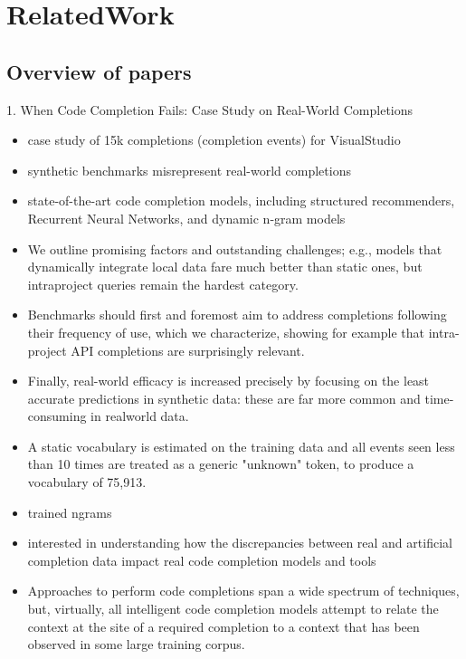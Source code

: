 \chapter{RelatedWork}
\label{chap:RelatedWork}

\section{Overview of papers}
1. When Code Completion Fails: Case Study on
Real-World Completions
\begin{itemize}
	\item case study of 15k completions (completion events) for VisualStudio
	\item synthetic benchmarks misrepresent real-world completions
	\item state-of-the-art code completion models, including structured recommenders, Recurrent Neural Networks, and dynamic n-gram models
    \item We outline promising factors and outstanding challenges; e.g., models that dynamically integrate local data fare much better than static ones, but intraproject queries remain the hardest category.
    \item Benchmarks should first and foremost aim to address completions following their frequency of use, which we characterize, showing for example that intra-project API completions are surprisingly relevant.
    \item Finally, real-world efficacy is increased precisely by focusing on the least accurate predictions in synthetic data: these are far more common and time-consuming in realworld data.
    \item A static vocabulary is estimated on the training data and all events seen less than 10 times are treated as a generic "unknown" token, to produce a vocabulary of 75,913.
    \item trained ngrams
    \item interested in understanding how the discrepancies between real and artificial completion data impact real code completion models and tools
    \item Approaches to perform code completions span a wide spectrum of techniques, but, virtually, all intelligent code completion models attempt to relate the context at the site of a required completion to a context that has been observed in some large training corpus.
\end{itemize}